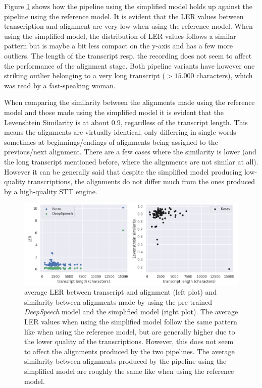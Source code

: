 Figure \ref{pipeline_scatterplot_ls_en} shows how the pipeline using the simplified model holds up against the pipeline using the reference model. It is evident that the \ac{LER} values between transcription and alignment are very low when using the reference model. When using the simplified model, the distribution of \ac{LER} values follows a similar pattern but is maybe a bit less compact on the y-axis and has a few more outliers. The length of the transcript resp. the recording does not seem to affect the performance of the alignment stage. Both pipeline variants have however one striking outlier belonging to a very long transcript ($>15.000$ characters), which was read by a fast-speaking woman. 

When comparing the similarity between the alignments made using the reference model and those made using the simplified model it is evident that the Levenshtein Similarity is at about $0.9$, regardless of the transcript length. This means the alignments are virtually identical, only differring in single words sometimes at beginnings/endings of alignments being assigned to the previous/next alignment. There are a few cases where the similarity is lower (and the long transcript mentioned before, where the alignments are not similar at all). However it can be generally said that despite the simplified model producing low-quality transcriptions, the alignments do not differ much from the ones produced by a high-quality \ac{STT} engine.

\begin{figure}[h!]
	\includegraphics[width=\linewidth]{./img/scatterplot_ls.png}
	\caption{average \ac{LER} between transcript and alignment (left plot) and similarity between alignments made by using the pre-trained \textit{DeepSpeech} model and the simplified model (right plot). The average \ac{LER} values when using the simplified model follow the same pattern like when using the reference model, but are generally higher due to the lower quality of the transcriptions. However, this does not seem to affect the alignments produced by the two pipelines. The average similarity between alignments produced by the pipeline using the simplified model are roughly the same like when using the reference model.}
	\label{pipeline_scatterplot_ls_en}
\end{figure}


